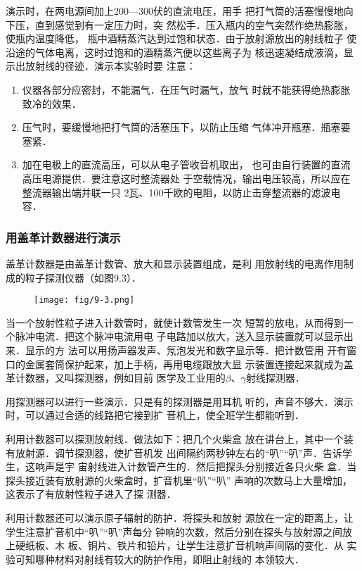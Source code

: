 演示时，在两电源间加上200—300伏的直流电压，用手
把打气筒的活塞慢慢地向下压，直到感觉到有一定压力时，突
然松手．压入瓶内的空气突然作绝热膨胀，使瓶内温度降低，
瓶中酒精蒸汽达到过饱和状态．由于放射源放出的射线粒子
使沿途的气体电离，这时过饱和的酒精蒸汽便以这些离子为
核迅速凝结成液滴，显示出放射线的径迹．演示本实验时要
注意：
\begin{enumerate}
    \item 仪器各部分应密封，不能漏气．在压气时漏气，放气
    时就不能获得绝热膨胀致冷的效果．
    \item 压气时，要缓慢地把打气筒的活塞压下，以防止压缩
    气体冲开瓶塞．瓶塞要塞紧．
    \item 加在电极上的直流高压，可以从电子管收音机取出，
    也可由自行装置的直流高压电源提供．要注意这时整流器处
    于空载情况，输出电压较高，所以应在整流器输出端并联一只
    2瓦、100千欧的电阻，以防止击穿整流器的滤波电容．
\end{enumerate}


\subsubsection{用盖革计数器进行演示}
盖革计数器是由盖革计数管、放大和显示装置组成，是利
用放射线的电离作用制成的粒子探测仪器（如图9.3）．
\begin{figure}[htp]
    \centering
    \texttt{[image: fig/9-3.png]}
    \caption{}
\end{figure}


当一个放射性粒子进入计数管时，就使计数管发生一次
短暂的放电，从而得到一个脉冲电流．把这个脉冲电流用电
子电路加以放大，送入显示装置就可以显示出来．显示的方
法可以用扬声器发声、氖泡发光和数字显示等．把计数管用
开有窗口的金属套筒保护起来，加上手柄，再用电缆跟放大显
示装置连接起来就成为盖革计数器，又叫探测器，例如目前
医学及工业用的$\beta$、$\gamma$射线探测器．

用探测器可以进行一些演示．只是有的探测器是用耳机
听的，声音不够大．演示时，可以通过合适的线路把它接到扩
音机上，使全班学生都能听到．

利用计数器可以探测放射线．做法如下：把几个火柴盒
放在讲台上，其中一个装有放射源．调节探测器，使扩音机发
出间隔约两秒钟左右的“叭”“叭”声．告诉学生，这响声是宇
宙射线进入计数管产生的．然后把探头分别接近各只火柴
盒．当探头接近装有放射源的火柴盒时，扩音机里“叭”“叭”
声响的次数马上大量增加，这表示了有放射性粒子进入了探
测器．

利用计数器还可以演示原子辐射的防护．将探头和放射
源放在一定的距离上，让学生注意扩音机中“叭”“叭”声每分
钟响的次数，然后分别在探头与放射源之间放上硬纸板、木
板、铜片、铁片和铅片，让学生注意扩音机响声间隔的变化．从
实验可知哪种材料对射线有较大的防护作用，即阻止射线的
本领较大．

